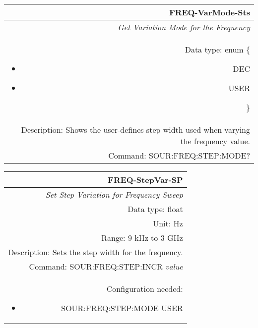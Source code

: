 \documentclass[openany]{article}
\begin{document}
		\begin{tabular}{N}
			\hline
			\bfseries FREQ-VarMode-Sts \\ \hline
			\emph{Get Variation Mode for the Frequency} \\
			Data type: enum \{\begin{itemize}[noitemsep]
				\small
				\item[] DEC
				\item[] USER
			\end{itemize}\} \\ 
			Description: Shows the user-defines step width used when varying the frequency value. \\
			Command: SOUR:FREQ:STEP:MODE? \\

		\end{tabular}
%
		\begin{tabular}{N}
			\hline
			\bfseries FREQ-StepVar-SP \\ \hline
			\emph{Set Step Variation for Frequency Sweep} \\
			Data type: float \\
			Unit: Hz \\
			Range: 9 kHz to 3 GHz \\
			Description: Sets the step width for the frequency.\\
			Command: SOUR:FREQ:STEP:INCR \emph{value} \\
			Configuration needed: \begin{itemize}[noitemsep]
                                 \small
                                 \item[] SOUR:FREQ:STEP:MODE USER
                         \end{itemize} \\
			
		\end{tabular}
\end{document}
